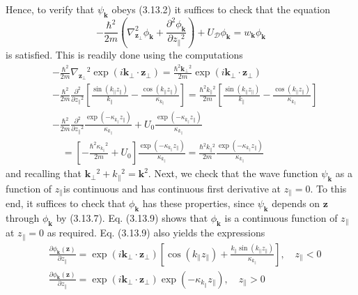 \documentclass{article}
\begin{document}
Hence, to verify that $\psi_{\boldsymbol{k}}$ obeys (3.13.2) it suffices to check that the equation
$$
\begin{equation*}
-\frac{\hbar^{2}}{2 m}\left(\nabla_{\boldsymbol{z}_{\perp}}^{2} \phi_{\boldsymbol{k}}+\frac{\partial^{2} \phi_{\boldsymbol{k}}}{\partial z_{\|}{ }^{2}}\right)+U_{\mathcal{D}} \phi_{\boldsymbol{k}}=w_{\boldsymbol{k}} \phi_{\boldsymbol{k}} \tag{3.13.13}
\end{equation*}
$$
is satisfied. This is readily done using the computations
$$
\begin{align*}
& -\frac{\hbar^{2}}{2 m} \nabla_{\boldsymbol{z}_{\perp}}{ }^{2} \exp \left(i \boldsymbol{k}_{\perp} \cdot \boldsymbol{z}_{\perp}\right)=\frac{\hbar^{2} \boldsymbol{k}_{\perp}{ }^{2}}{2 m} \exp \left(i \boldsymbol{k}_{\perp} \cdot \boldsymbol{z}_{\perp}\right)  \tag{3.13.14}\\
& -\frac{\hbar^{2}}{2 m} \frac{\partial^{2}}{\partial z_{\|}{ }^{2}}\left[\frac{\sin \left(k_{\|} z_{\|}\right)}{k_{\|}}-\frac{\cos \left(k_{\|} z_{\|}\right)}{\kappa_{k_{\|}}}\right]=\frac{\hbar^{2} k_{\|}{ }^{2}}{2 m}\left[\frac{\sin \left(k_{\|} z_{\|}\right)}{k_{\|}}-\frac{\cos \left(k_{\|} z_{\|}\right)}{\kappa_{k_{\|}}}\right]  \tag{3.13.15}\\
& -\frac{\hbar^{2}}{2 m} \frac{\partial^{2}}{\partial z_{\|}{ }^{2}} \frac{\exp \left(-\kappa_{k_{\|}} z_{\|}\right)}{\kappa_{k_{\|}}}+U_{0} \frac{\exp \left(-\kappa_{k_{\|}} z_{\|}\right)}{\kappa_{k_{\|}}}  \tag{3.13.16}\\
& \quad=\left[-\frac{\hbar^{2} \kappa_{k_{\|}}{ }^{2}}{2 m}+U_{0}\right] \frac{\exp \left(-\kappa_{k_{\|}} z_{\|}\right)}{\kappa_{k_{\|}}}=\frac{\hbar^{2} k_{\|}{ }^{2}}{2 m} \frac{\exp \left(-\kappa_{k_{\|}} z_{\|}\right)}{\kappa_{k_{\|}}}
\end{align*}
$$
and recalling that $\boldsymbol{k}_{\perp}{ }^{2}+k_{\|}{ }^{2}=\boldsymbol{k}^{2}$.
Next, we check that the wave function $\psi_{\boldsymbol{k}}$ as a function of $z_{\|}$is continuous and has continuous first derivative at $z_{\|}=0$. To this end, it suffices to check that $\phi_{\boldsymbol{k}}$ has these properties, since $\psi_{\boldsymbol{k}}$ depends on $\boldsymbol{z}$ through $\phi_{\boldsymbol{k}}$ by (3.13.7). Eq. (3.13.9) shows that $\phi_{\boldsymbol{k}}$ is a continuous function of $z_{\|}$at $z_{\|}=0$ as required. Eq. (3.13.9) also yields the expressions
$$
\begin{align*}
& \frac{\partial \phi_{\boldsymbol{k}}(\boldsymbol{z})}{\partial z_{\|}}=\exp \left(i \boldsymbol{k}_{\perp} \cdot \boldsymbol{z}_{\perp}\right)\left[\cos \left(k_{\|} z_{\|}\right)+\frac{k_{\|} \sin \left(k_{\|} z_{\|}\right)}{\kappa_{k_{\|}}}\right], \quad z_{\|}<0  \tag{3.13.17}\\
& \frac{\partial \phi_{\boldsymbol{k}}(\boldsymbol{z})}{\partial z_{\|}}=\exp \left(i \boldsymbol{k}_{\perp} \cdot \boldsymbol{z}_{\perp}\right) \exp \left(-\kappa_{k_{\|}} z_{\|}\right), \quad z_{\|}>0
\end{align*}
$$
\end{document}
